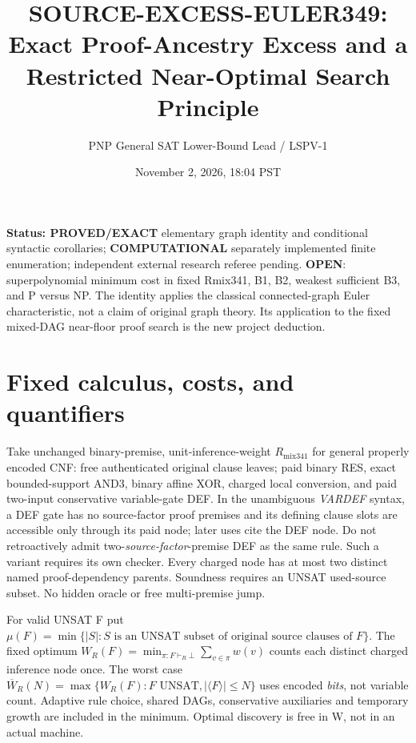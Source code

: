 \documentclass[11pt]{article}
\title{SOURCE-EXCESS-EULER349: Exact Proof-Ancestry Excess and a Restricted Near-Optimal Search Principle}
\author{PNP General SAT Lower-Bound Lead / LSPV-1}
\date{November 2, 2026, 18:04 PST}
\begin{document}
\maketitle

\noindent\textbf{Status: PROVED/EXACT} elementary graph identity and conditional syntactic corollaries; \textbf{COMPUTATIONAL} separately implemented finite enumeration; independent external research referee pending. \textbf{OPEN}: superpolynomial minimum cost in fixed Rmix341, B1, B2, weakest sufficient B3, and P versus NP. The identity applies the classical connected-graph Euler characteristic, not a claim of original graph theory. Its application to the fixed mixed-DAG near-floor proof search is the new project deduction.

\section*{Fixed calculus, costs, and quantifiers}
Take unchanged binary-premise, unit-inference-weight $R_{\mathrm{mix341}}$ for general properly encoded CNF: free authenticated original clause leaves; paid binary RES, exact bounded-support AND3, binary affine XOR, charged local conversion, and paid two-input conservative variable-gate DEF. In the unambiguous \emph{VARDEF} syntax, a DEF gate has no source-factor proof premises and its defining clause slots are accessible only through its paid node; later uses cite the DEF node. Do not retroactively admit two-\emph{source-factor}-premise DEF as the same rule. Such a variant requires its own checker. Every charged node has at most two distinct named proof-dependency parents. Soundness requires an UNSAT used-source subset. No hidden oracle or free multi-premise jump.

For valid UNSAT F put $\mu(F)=\min\{|S|:S\text{ is an UNSAT subset of original source clauses of }F\}$. The fixed optimum $W_R(F)=\min_{\pi:F\vdash_R\bot}\sum_{v\in\pi}w(v)$ counts each distinct charged inference node once. The worst case $\overline W_R(N)=\max\{W_R(F):F\text{ UNSAT},|\langle F\rangle|\le N\}$ uses encoded \emph{bits}, not variable count. Adaptive rule choice, shared DAGs, conservative auxiliaries and temporary growth are included in the minimum. Optimal discovery is free in W, not in an actual machine.
\end{document}

